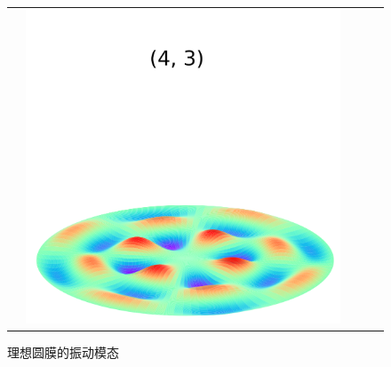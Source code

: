 \documentclass[a4paper]{ctexart}
\begin{document}
\begin{figure}[htbp]
\begin{tabular}{ccccc}
			& \includegraphics[scale=0.4]{4_3.png} \\
		\end{tabular}
		\centering 
		\caption{理想圆膜的振动模态}
		\label{visual mode}
	\end{figure}
\end{document}

